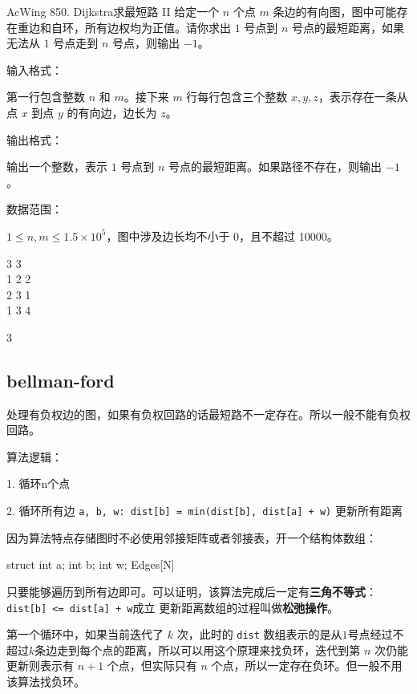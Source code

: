 \begin{titledbox}{AcWing 850. Dijkstra求最短路 II}
    给定一个 $n$ 个点 $m$ 条边的有向图，图中可能存在重边和自环，所有边权均为正值。请你求出 $1$ 号点到 $n$ 号点的最短距离，如果无法从 $1$ 号点走到 $n$ 号点，则输出 $-1$。

    输入格式：

    第一行包含整数 $n$ 和 $m$。接下来 $m$ 行每行包含三个整数 $x,y,z$，表示存在一条从点 $x$ 到点 $y$ 的有向边，边长为 $z$。

    输出格式：

    输出一个整数，表示 $1$ 号点到 $n$ 号点的最短距离。如果路径不存在，则输出 $-1$。

    数据范围：

    $1 \le n, m \le 1.5 \times 10^5$，图中涉及边长均不小于 0，且不超过 10000。

    \begin{inputblock}
        3 3 \\
        1 2 2 \\
        2 3 1 \\
        1 3 4
    \end{inputblock}
    \begin{outputblock}
        3
    \end{outputblock}
\end{titledbox}

\subsection{bellman-ford}
处理有负权边的图，如果有负权回路的话最短路不一定存在。所以一般不能有负权回路。

算法逻辑：

1. 循环n个点

2. 循环所有边 \lstinline{a, b, w: dist[b] = min(dist[b], dist[a] + w)} 更新所有距离

因为算法特点存储图时不必使用邻接矩阵或者邻接表，开一个结构体数组：

\begin{mycpponecol}[边集]
    struct {
        int a;
        int b;
        int w;
    } Edges[N]
\end{mycpponecol}

只要能够遍历到所有边即可。可以证明，该算法完成后一定有\textbf{三角不等式}：\lstinline{dist[b] <= dist[a] + w}成立
更新距离数组的过程叫做\textbf{松弛操作}。

第一个循环中，如果当前迭代了 $k$ 次，此时的 \lstinline{dist} 数组表示的是从$1$号点经过不超过$k$条边走到每个点的距离，所以可以用这个原理来找负环，迭代到第 $n$ 次仍能更新则表示有 $n+1$ 个点，但实际只有 $n$ 个点，所以一定存在负环。但一般不用该算法找负环。

